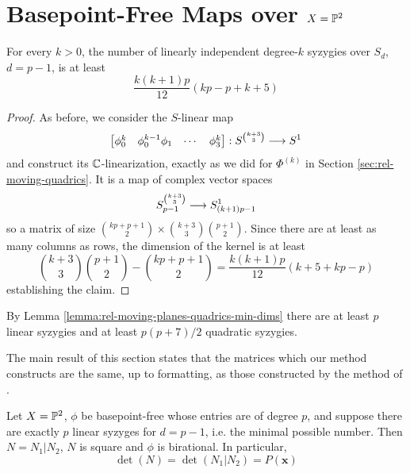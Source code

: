 \documentclass[fleqn,reqno]{amsart}
\begin{document}
\section{Basepoint-Free Maps over $X=\mathbb{P}^2$}
\label{sec:bpf-maps-pp2}

\begin{lemma}
	\label{lemma:rel-moving-planes-quadrics-min-dims}
	For every $k>0$, the number of linearly independent degree-$k$ syzygies over $S_{d}$,
	$d=p-1$, is at least
	\[
		\frac{k(k+1)p}{12}(kp-p+k+5)
	\]
\end{lemma}

\begin{proof}
	As before, we consider the $S$-linear map
	\[
		\begin{bmatrix}\phi_0^k& \phi_0^{k-1}\phi_1& \cdots& \phi_3^k\end{bmatrix}:
		S^{\binom{k+3}{3}}\longrightarrow S^1
	\]
	and construct its $\mathbb{C}$-linearization,
	exactly as we did for $\Phi^{(k)}$ in Section \ref{sec:rel-moving-quadrics}.
	It is a map of complex vector spaces
	\[
		S_{p-1}^{\binom{k+3}{3}}\longrightarrow S_{(k+1)p-1}^1
	\]
	so a matrix of size $\binom{kp+p+1}{2}\times\binom{k+3}{3}\binom{p+1}{2}$.
	Since there are at least as many columns as rows,
	the dimension of the kernel is at least
	\[
		\binom{k+3}{3}\binom{p+1}{2}-\binom{kp+p+1}{2}=\frac{k(k+1)p}{12}(k+5+kp-p)
	\]
	establishing the claim.
\end{proof}

\begin{remark}
	\label{rem:rel-moving-planes-quadrics-num-syz}
	By Lemma \ref{lemma:rel-moving-planes-quadrics-min-dims} there are
	at least $p$ linear syzygies and at least $p(p+7)/2$ quadratic syzygies.
\end{remark}

\begin{paragraph*}
	The main result of this section states that the matrices which our method constructs
	are the same, up to formatting, as those constructed by the method of \citet{00-CGZ-JSC}.
\end{paragraph*}

\begin{theorem}
	\label{thm:rel-moving-planes-quadrics}
	Let $X=\mathbb{P}^2$, $\phi$ be basepoint-free whose entries are of degree $p$,
	and suppose there are exactly $p$ linear syzyges for $d=p-1$, i.e. the minimal possible number.
	Then $N=N_1|N_2$, $N$ is square and $\phi$ is birational. In particular,
	\[
		\det(N)=\det(N_1|N_2)=P(\mathbf x)
	\]
\end{theorem}
\end{document}
